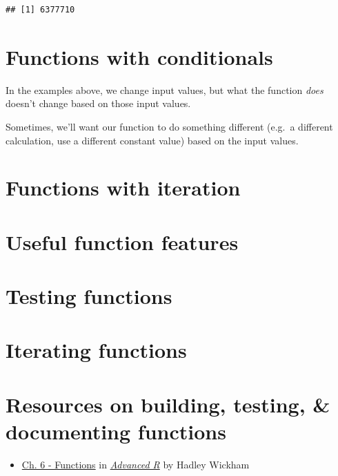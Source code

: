 \documentclass[
]{book}
\providecommand{\tightlist}{%
  \setlength{\itemsep}{0pt}\setlength{\parskip}{0pt}}
\begin{document}
\begin{verbatim}
## [1] 6377710
\end{verbatim}

\hypertarget{functions-with-conditionals}{%
\section{Functions with conditionals}\label{functions-with-conditionals}}

In the examples above, we change input values, but what the function \emph{does} doesn't change based on those input values.

Sometimes, we'll want our function to do something different (e.g.~a different calculation, use a different constant value) based on the input values.

\hypertarget{functions-with-iteration}{%
\section{Functions with iteration}\label{functions-with-iteration}}

\hypertarget{useful-function-features}{%
\section{Useful function features}\label{useful-function-features}}

\hypertarget{testing-functions}{%
\section{Testing functions}\label{testing-functions}}

\hypertarget{iterating-functions}{%
\section{Iterating functions}\label{iterating-functions}}

\hypertarget{resources-on-building-testing-documenting-functions}{%
\section{Resources on building, testing, \& documenting functions}\label{resources-on-building-testing-documenting-functions}}

\begin{itemize}
\tightlist
\item
  \href{https://adv-r.hadley.nz/functions.html}{Ch. 6 - Functions} in \href{https://adv-r.hadley.nz/}{\emph{Advanced R}} by Hadley Wickham
\end{itemize}
\end{document}
